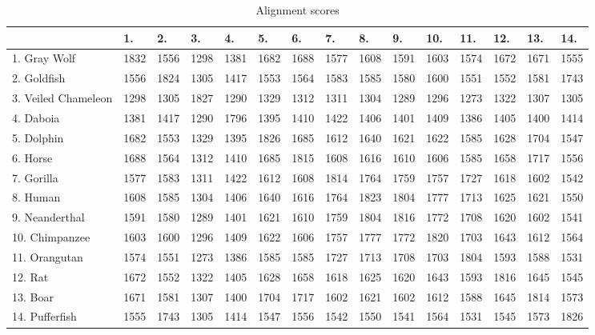 \documentclass[a4paper,11pt]{article}
\begin{document}
\begin{table}[htbp,resetmargins=true]
\footnotesize
\caption{Alignment scores}
\label{kmers}
\begin{center}
\begin{tabular}{@{}lllllllllllllll@{}}
\hline
 & 1.  & 2.  & 3.  & 4.  & 5.  & 6.  & 7.  & 8.  & 9.  & 10.  & 11.  & 12.  & 13.  & 14.\\
\hline

1. Gray Wolf & 1832 & 1556 & 1298 & 1381 & 1682 & 1688 & 1577 & 1608 & 1591 & 1603 & 1574 & 1672 & 1671 & 1555\\
2. Goldfish & 1556 & 1824 & 1305 & 1417 & 1553 & 1564 & 1583 & 1585 & 1580 & 1600 & 1551 & 1552 & 1581 & 1743\\
3. Veiled Chameleon & 1298 & 1305 & 1827 & 1290 & 1329 & 1312 & 1311 & 1304 & 1289 & 1296 & 1273 & 1322 & 1307 & 1305\\
4. Daboia & 1381 & 1417 & 1290 & 1796 & 1395 & 1410 & 1422 & 1406 & 1401 & 1409 & 1386 & 1405 & 1400 & 1414\\
5. Dolphin & 1682 & 1553 & 1329 & 1395 & 1826 & 1685 & 1612 & 1640 & 1621 & 1622 & 1585 & 1628 & 1704 & 1547\\
6. Horse & 1688 & 1564 & 1312 & 1410 & 1685 & 1815 & 1608 & 1616 & 1610 & 1606 & 1585 & 1658 & 1717 & 1556\\
7. Gorilla & 1577 & 1583 & 1311 & 1422 & 1612 & 1608 & 1814 & 1764 & 1759 & 1757 & 1727 & 1618 & 1602 & 1542\\
8. Human & 1608 & 1585 & 1304 & 1406 & 1640 & 1616 & 1764 & 1823 & 1804 & 1777 & 1713 & 1625 & 1621 & 1550\\
9. Neanderthal & 1591 & 1580 & 1289 & 1401 & 1621 & 1610 & 1759 & 1804 & 1816 & 1772 & 1708 & 1620 & 1602 & 1541\\
10. Chimpanzee & 1603 & 1600 & 1296 & 1409 & 1622 & 1606 & 1757 & 1777 & 1772 & 1820 & 1703 & 1643 & 1612 & 1564\\
11. Orangutan & 1574 & 1551 & 1273 & 1386 & 1585 & 1585 & 1727 & 1713 & 1708 & 1703 & 1804 & 1593 & 1588 & 1531\\
12. Rat & 1672 & 1552 & 1322 & 1405 & 1628 & 1658 & 1618 & 1625 & 1620 & 1643 & 1593 & 1816 & 1645 & 1545\\
13. Boar & 1671 & 1581 & 1307 & 1400 & 1704 & 1717 & 1602 & 1621 & 1602 & 1612 & 1588 & 1645 & 1814 & 1573\\
14. Pufferfish & 1555 & 1743 & 1305 & 1414 & 1547 & 1556 & 1542 & 1550 & 1541 & 1564 & 1531 & 1545 & 1573 & 1826\\

\hline
\end{tabular}
\end{center}
\end{table}
\end{document}
